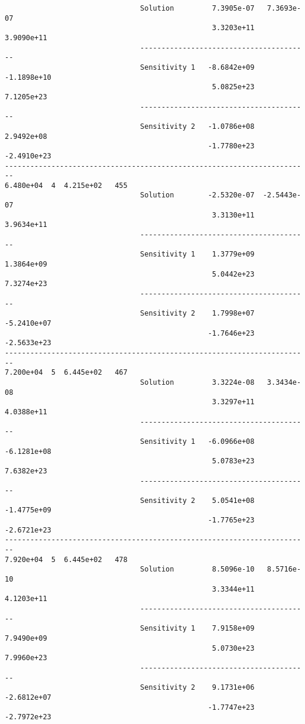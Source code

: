 \begin{verbatim}
                                Solution         7.3905e-07   7.3693e-07 
                                                 3.3203e+11   3.9090e+11 
                                ----------------------------------------
                                Sensitivity 1   -8.6842e+09  -1.1898e+10 
                                                 5.0825e+23   7.1205e+23 
                                ----------------------------------------
                                Sensitivity 2   -1.0786e+08   2.9492e+08 
                                                -1.7780e+23  -2.4910e+23 
------------------------------------------------------------------------
6.480e+04  4  4.215e+02   455
                                Solution        -2.5320e-07  -2.5443e-07 
                                                 3.3130e+11   3.9634e+11 
                                ----------------------------------------
                                Sensitivity 1    1.3779e+09   1.3864e+09 
                                                 5.0442e+23   7.3274e+23 
                                ----------------------------------------
                                Sensitivity 2    1.7998e+07  -5.2410e+07 
                                                -1.7646e+23  -2.5633e+23 
------------------------------------------------------------------------
7.200e+04  5  6.445e+02   467
                                Solution         3.3224e-08   3.3434e-08 
                                                 3.3297e+11   4.0388e+11 
                                ----------------------------------------
                                Sensitivity 1   -6.0966e+08  -6.1281e+08 
                                                 5.0783e+23   7.6382e+23 
                                ----------------------------------------
                                Sensitivity 2    5.0541e+08  -1.4775e+09 
                                                -1.7765e+23  -2.6721e+23 
------------------------------------------------------------------------
7.920e+04  5  6.445e+02   478
                                Solution         8.5096e-10   8.5716e-10 
                                                 3.3344e+11   4.1203e+11 
                                ----------------------------------------
                                Sensitivity 1    7.9158e+09   7.9490e+09 
                                                 5.0730e+23   7.9960e+23 
                                ----------------------------------------
                                Sensitivity 2    9.1731e+06  -2.6812e+07 
                                                -1.7747e+23  -2.7972e+23 

\end{verbatim}
